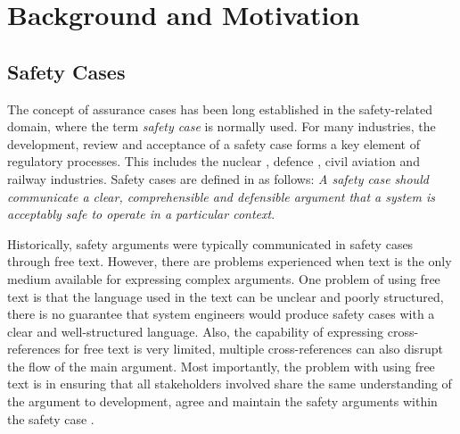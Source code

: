 \section{Background and Motivation}
\label{sec:background}

\subsection{Safety Cases}

The concept of assurance cases has been long established in the safety-related domain, where the term \textit{safety case} is normally used. 
For many industries, the development, review and acceptance of a safety case forms a key element of regulatory processes. This includes the nuclear \cite{hse}, defence \cite{mod2007}, civil aviation \cite{caa2007} and railway \cite{yellowBook2007} industries. 
Safety cases are defined in \cite{kelly2004goal} as follows: \textit{A safety case should communicate a clear, comprehensible and defensible argument that a system is acceptably safe to operate in a particular context}. 

Historically, safety arguments were typically communicated in safety cases through free text. However, there are problems experienced when text is the only medium available for expressing complex arguments. 
One problem of using free text is that the language used in the text can be unclear and poorly structured, there is no guarantee that system engineers would produce safety cases with a clear and well-structured language. 
Also, the capability of expressing cross-references for free text is very limited, multiple cross-references can also disrupt the flow of the main argument. 
Most importantly, the problem with using free text is in ensuring that all stakeholders involved share the same understanding of the argument to development, agree and maintain the safety arguments within the safety case \cite{kelly2004goal}.

